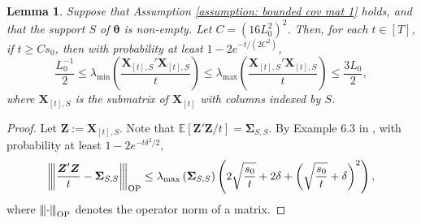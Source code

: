 \documentclass[aos,preprint]{imsart}
\theoremstyle{plain}
\newtheorem{lemma}[theorem]{Lemma}
\theoremstyle{definition}
\newcommand{\btheta}{\boldsymbol{\theta}}
\newcommand{\bd}[1]{\boldsymbol{#1}}
\newcommand{\hbtheta}{\widehat{\boldsymbol{\theta}}}
\newcommand{\bX}{\boldsymbol{X}}
\newcommand{\bSigma}{\boldsymbol{\Sigma}}
\newcommand{\op}[1]{{\left\vert\kern-0.25ex\left\vert\kern-0.25ex\left\vert #1\right\vert\kern-0.25ex\right\vert\kern-0.25ex\right\vert}}
\newcommand{\lmin}[1]{\lambda_{\min}\left(#1\right)}
\newcommand{\lmax}[1]{\lambda_{\max}\left(#1\right)}
\newcommand{\ltheta}{\hbtheta^{\textup{Lasso}}}
\newcommand{\bZ}{\boldsymbol{Z}}
\newcommand{\Exp}{\mathbb{E}}
\begin{document}
\begin{appendix}

\begin{lemma} \label{lemma: lower eigenvalue whp}
Suppose that Assumption \ref{assumption: bounded cov mat 1} holds, and that the support $S$ of $\btheta$ is non-empty.  Let $C = (16L_0^2)^2$.
Then, for each $t \in [T]$, if $t \ge  C s_0$, then with probability at least $1-2e^{-t/(2C^2)}$, 
$$
\frac{L_0^{-1}}{2} \le \lmin{\frac{\bX_{[t],S}'\bX_{[t],S}}{t}} \le \lmax{\frac{\bX_{[t],S}'\bX_{[t],S}}{t}}\le \frac{3L_0}{2},
$$
where $\bX_{[t],S}$ is the submatrix of $\bX_{[t]}$ with columns indexed by $S$. 
\end{lemma}
\begin{proof} Let $\bZ := \bX_{[t],S}$. 
Note that $\Exp[\bZ'\bZ/ t] =  \bSigma_{S,S}$. By Example 6.3 in \cite{wainwright2019high}, with probability at least $1-2e^{-t\delta^2/2}$,
$$\op{\frac{\bZ'\bZ}{t}-\bSigma_{S,S}}_{\textup{OP}} \le \lmax{\bSigma_{S,S}} \left(2\sqrt{\frac{s_0}{t}}+2\delta+\left(\sqrt{\frac{s_0}{t}}+\delta\right)^2\right),$$
where $\op{\cdot}_{\textup{OP}}$ denotes the operator norm of a matrix. 


\end{proof}
\end{appendix}
\end{document}
